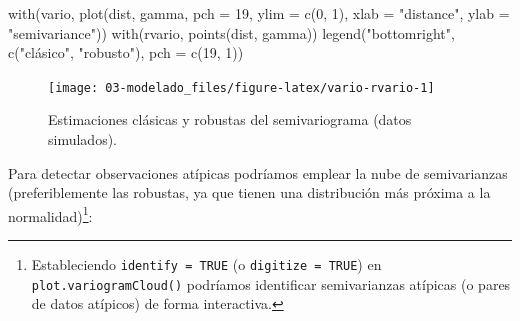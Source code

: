 \documentclass[
  spanish,
]{book}
\newenvironment{Shaded}{\begin{snugshade}}{\end{snugshade}}
\newcommand{\AttributeTok}[1]{\textcolor[rgb]{0.77,0.63,0.00}{#1}}
\newcommand{\DecValTok}[1]{\textcolor[rgb]{0.00,0.00,0.81}{#1}}
\newcommand{\FunctionTok}[1]{\textcolor[rgb]{0.00,0.00,0.00}{#1}}
\newcommand{\NormalTok}[1]{#1}
\newcommand{\OtherTok}[1]{\textcolor[rgb]{0.56,0.35,0.01}{#1}}
\newcommand{\SpecialCharTok}[1]{\textcolor[rgb]{0.00,0.00,0.00}{#1}}
\newcommand{\StringTok}[1]{\textcolor[rgb]{0.31,0.60,0.02}{#1}}
\theoremstyle{break}
\theoremstyle{definition}
\theoremstyle{definition}
\theoremstyle{definition}
\theoremstyle{definition}
\theoremstyle{remark}
\begin{document}
\begin{Shaded}
\begin{Highlighting}[]
\FunctionTok{with}\NormalTok{(vario, }\FunctionTok{plot}\NormalTok{(dist, gamma, }\AttributeTok{pch =} \DecValTok{19}\NormalTok{, }\AttributeTok{ylim =} \FunctionTok{c}\NormalTok{(}\DecValTok{0}\NormalTok{, }\DecValTok{1}\NormalTok{),}
                        \AttributeTok{xlab =} \StringTok{"distance"}\NormalTok{, }\AttributeTok{ylab =}  \StringTok{"semivariance"}\NormalTok{))}
\FunctionTok{with}\NormalTok{(rvario, }\FunctionTok{points}\NormalTok{(dist, gamma))}
\FunctionTok{legend}\NormalTok{(}\StringTok{"bottomright"}\NormalTok{, }\FunctionTok{c}\NormalTok{(}\StringTok{"clásico"}\NormalTok{, }\StringTok{"robusto"}\NormalTok{), }\AttributeTok{pch =} \FunctionTok{c}\NormalTok{(}\DecValTok{19}\NormalTok{, }\DecValTok{1}\NormalTok{))}
\end{Highlighting}
\end{Shaded}

\begin{figure}[!htb]

{\centering \texttt{[image: 03-modelado\_files/figure-latex/vario-rvario-1]} 

}

\caption{Estimaciones clásicas y robustas del semivariograma (datos simulados).}\label{fig:vario-rvario}
\end{figure}

Para detectar observaciones atípicas podríamos emplear la nube de semivarianzas (preferiblemente las robustas, ya que tienen una distribución más próxima a la normalidad)\footnote{Estableciendo \texttt{identify\ =\ TRUE} (o \texttt{digitize\ =\ TRUE}) en \texttt{plot.variogramCloud()} podríamos identificar semivarianzas atípicas (o pares de datos atípicos) de forma interactiva.}:

\begin{Shaded}
\end{Shaded}
\end{document}
